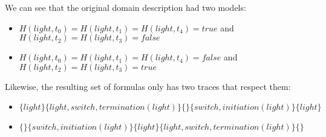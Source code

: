 We can see that the original domain description had two models:
\begin{itemize}
  \item $H(light,t_0)=H(light,t_1)=H(light,t_4)=true$ and $H(light,t_2)=H(light,t_3)=false$
  \item $H(light,t_0)=H(light,t_1)=H(light,t_4)=false$ and $H(light,t_2)=H(light,t_3)=true$
\end{itemize}

Likewise, the resulting set of formulas only has two traces that respect them:
\begin{itemize}
  \item $\{light\}\{light,switch,termination(light)\}\{\}\{switch,initiation(light)\}\{light\}$
  \item $\{\}\{switch,initiation(light)\}\{light\}\{light,switch,termination(light)\}\{\}$
\end{itemize}

          \iffalse

          \subsection{Naive approach from iterative}

          To make the translation, we need to start from a domain langage for wich $\Pi$ is a discrete set of timepoint, and $\preceq$ is a total ordering of $\Pi$. On top of that, $\Pi$ need a timepoint $T_0$ such as $\forall T_i \in \Pi, T_0\preceq T_i$.

          \subsubsection{Propositions}

          \begin{itemize}
            \item c-proposition

            $$\Box(A_i\bigwedge C_i)\rightarrow \circ F_i$$ or $$\Box(A_i\bigwedge C_i)\rightarrow \circ \neg F_i$$
            \item h-proposition

            $$\circ^{T_i}F_i$$ or $$\circ^{T_i} \neg F_i$$
            \item t-proposition

            $$\circ^{T_i}A_i$$
          \end{itemize}

          \fi
